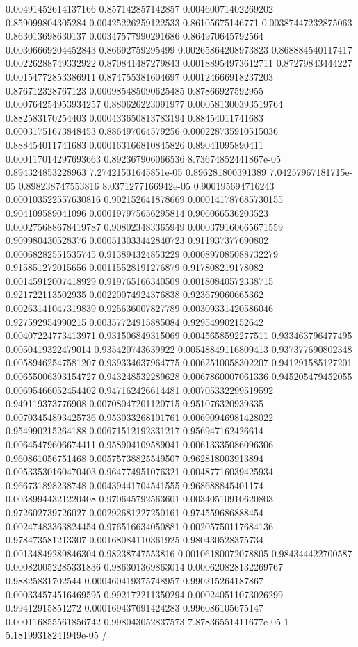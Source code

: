 \begin{table}
\begin{tabu}
\begin{sparkline}{10}
0.00491452614137166 0.857142857142857 0.00460071402269202 0.859099804305284 0.00425226259122533 0.86105675146771 0.00387447232875063 0.863013698630137 0.00347577990291686 0.864970645792564 0.00306669204452843 0.86692759295499 0.00265864208973823 0.868884540117417 0.00226288749332922 0.870841487279843 0.00188954973612711 0.87279843444227 0.00154772853386911 0.874755381604697 0.00124666918237203 0.876712328767123 0.000985485090625485 0.87866927592955 0.000764254953934257 0.880626223091977 0.000581300393519764 0.882583170254403 0.000433650813783194 0.88454011741683 0.00031751673848453 0.886497064579256 0.000228735910515036 0.888454011741683 0.000163166810845826 0.89041095890411 0.000117014297693663 0.892367906066536 8.73674852441867e-05 0.894324853228963 7.27421531645851e-05 0.896281800391389 7.04257967181715e-05 0.898238747553816 8.0371277166942e-05 0.900195694716243 0.000103522557630816 0.902152641878669 0.000141787685730155 0.904109589041096 0.000197975656295814 0.906066536203523 0.000275688678419787 0.908023483365949 0.000379160665671559 0.909980430528376 0.000513033442840723 0.911937377690802 0.00068282551535745 0.913894324853229 0.000897085088732279 0.915851272015656 0.00115528191276879 0.917808219178082 0.00145912007418929 0.919765166340509 0.00180840572338715 0.921722113502935 0.00220074924376838 0.923679060665362 0.00263141047319839 0.925636007827789 0.00309331420586046 0.927592954990215 0.00357724915885084 0.929549902152642 0.00407224773413971 0.931506849315069 0.0045658592277511 0.933463796477495 0.0050419322479014 0.935420743639922 0.00548849116809413 0.937377690802348 0.00589462547581207 0.939334637964775 0.0062510058302207 0.941291585127201 0.00655006393154727 0.943248532289628 0.0067860007061336 0.945205479452055 0.00695466052454402 0.947162426614481 0.00705332299519592 0.949119373776908 0.00708047201120715 0.951076320939335 0.00703454893425736 0.953033268101761 0.00690946981428022 0.954990215264188 0.00671512192331217 0.956947162426614 0.00645479606674411 0.958904109589041 0.00613335086096306 0.960861056751468 0.00575738825549507 0.962818003913894 0.00533530160470403 0.964774951076321 0.00487716039425934 0.966731898238748 0.00439441704541555 0.968688845401174 0.00389944321220408 0.970645792563601 0.00340510910620803 0.972602739726027 0.00292681227250161 0.974559686888454 0.00247483363824454 0.976516634050881 0.00205750117684136 0.978473581213307 0.00168084110361925 0.980430528375734 0.00134849289846304 0.98238747553816 0.00106180072078805 0.984344422700587 0.000820052285331836 0.986301369863014 0.000620828132269767 0.98825831702544 0.000460419375748957 0.990215264187867 0.000334574516469595 0.992172211350294 0.000240511073026299 0.99412915851272 0.000169437691424283 0.996086105675147 0.000116855561856742 0.998043052837573 7.87836551411677e-05 1 5.18199318241949e-05 /

\end{sparkline}
\end{tabu}
\end{table}
